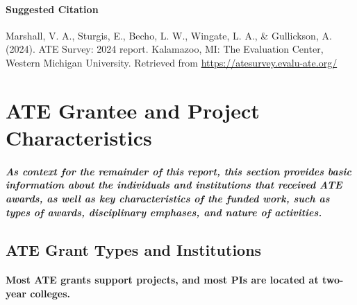\documentclass[
]{report}
\begin{document}
\hypertarget{suggested-citation}{%
\subsubsection{Suggested Citation}\label{suggested-citation}}

Marshall, V. A., Sturgis, E., Becho, L. W., Wingate, L. A., \& Gullickson, A. (2024). ATE Survey: 2024 report. Kalamazoo, MI: The Evaluation Center, Western Michigan University. Retrieved from \url{https://atesurvey.evalu-ate.org/}

\hypertarget{ate-grantee-and-project-characteristics}{%
\chapter{ATE Grantee and Project Characteristics}\label{ate-grantee-and-project-characteristics}}

\hypertarget{as-context-for-the-remainder-of-this-report-this-section-provides-basic-information-about-the-individuals-and-institutions-that-received-ate-awards-as-well-as-key-characteristics-of-the-funded-work-such-as-types-of-awards-disciplinary-emphases-and-nature-of-activities.}{%
\paragraph{As context for the remainder of this report, this section provides basic information about the individuals and institutions that received ATE awards, as well as key characteristics of the funded work, such as types of awards, disciplinary emphases, and nature of activities.}\label{as-context-for-the-remainder-of-this-report-this-section-provides-basic-information-about-the-individuals-and-institutions-that-received-ate-awards-as-well-as-key-characteristics-of-the-funded-work-such-as-types-of-awards-disciplinary-emphases-and-nature-of-activities.}}

\hypertarget{ate-grant-types-and-institutions}{%
\section{ATE Grant Types and Institutions}\label{ate-grant-types-and-institutions}}

\hypertarget{most-ate-grants-support-projects-and-most-pis-are-located-at-two-year-colleges.}{%
\subsubsection{Most ATE grants support projects, and most PIs are located at two-year colleges.}\label{most-ate-grants-support-projects-and-most-pis-are-located-at-two-year-colleges.}}
\end{document}
